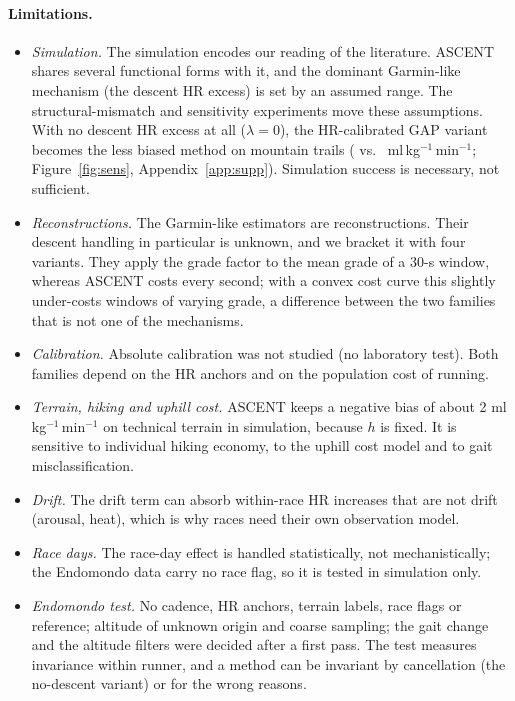 \documentclass[11pt,a4paper]{article}
\newcommand{\unit}{ml\,kg$^{-1}$\,min$^{-1}$}
\newcommand{\ascent}{ASCENT}
\begin{document}
\paragraph{Limitations.}
\begin{itemize}[leftmargin=*]
\item \emph{Simulation.} The simulation encodes our reading of the literature. \ascent{} shares several functional forms with it, and the dominant Garmin-like mechanism (the descent HR excess) is set by an assumed range. The structural-mismatch and sensitivity experiments move these assumptions. With no descent HR excess at all ($\lambda=0$), the HR-calibrated GAP variant becomes the less biased method on mountain trails (\nsensGtrailhrgapecclambdaL{} vs.\ \nsensASCENTecclambdaL{} \unit; Figure~\ref{fig:sens}, Appendix~\ref{app:supp}). Simulation success is necessary, not sufficient.
\item \emph{Reconstructions.} The Garmin-like estimators are reconstructions. Their descent handling in particular is unknown, and we bracket it with four variants. They apply the grade factor to the mean grade of a 30-s window, whereas \ascent{} costs every second; with a convex cost curve this slightly under-costs windows of varying grade, a difference between the two families that is not one of the mechanisms.
\item \emph{Calibration.} Absolute calibration was not studied (no laboratory test). Both families depend on the HR anchors and on the population cost of running.
\item \emph{Terrain, hiking and uphill cost.} \ascent{} keeps a negative bias of about 2 \unit{} on technical terrain in simulation, because $h$ is fixed. It is sensitive to individual hiking economy, to the uphill cost model and to gait misclassification.
\item \emph{Drift.} The drift term can absorb within-race HR increases that are not drift (arousal, heat), which is why races need their own observation model.
\item \emph{Race days.} The race-day effect is handled statistically, not mechanistically; the Endomondo data carry no race flag, so it is tested in simulation only.
\item \emph{Endomondo test.} No cadence, HR anchors, terrain labels, race flags or reference; altitude of unknown origin and coarse sampling; the gait change and the altitude filters were decided after a first pass. The test measures invariance within runner, and a method can be invariant by cancellation (the no-descent variant) or for the wrong reasons.
\end{itemize}
\end{document}
